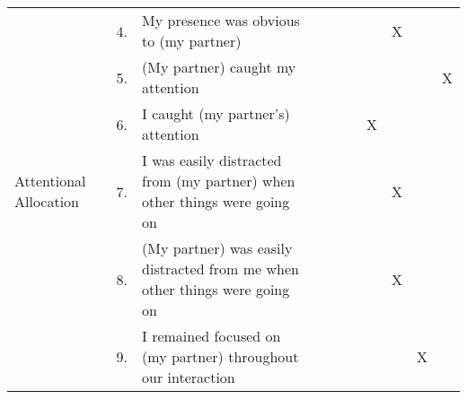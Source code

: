 \begin{table}[h]
\begin{tabular}{@{}lcl|ccccccc@{}}
                                     & 4.       & My presence was obvious to (my partner)                                    &                                                              &          &                                                              &         & X                                                         &       &                                                           \\
                                     & 5.       & (My partner) caught my attention                                           &                                                              &          &                                                              &         &                                                           &       & X                                                         \\
                                     & 6.       & I caught (my partner's) attention                                          &                                                              &          &                                                              & X       &                                                           &       &                                                           \\ \midrule
Attentional Allocation               & 7.       & I was easily distracted from (my partner) when other things were going on  &                                                              &          &                                                              &         & X                                                         &       &                                                           \\
                                     & 8.       & (My partner) was easily distracted from me when other things were going on &                                                              &          &                                                              &         & X                                                         &       &                                                           \\
                                     & 9.       & I remained focused on (my partner) throughout our interaction              &                                                              &          &                                                              &         &                                                           & X     &                                                           \\

\end{tabular}
\end{table}
